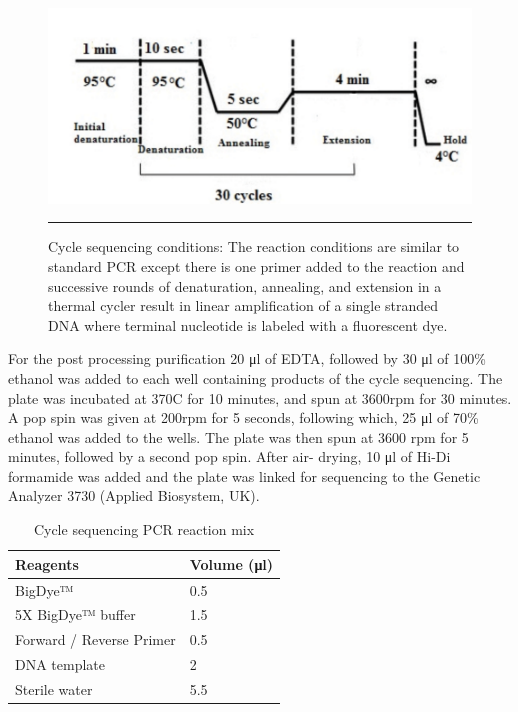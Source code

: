 \begin{figure}[!b]
\centering
\includegraphics[width=\linewidth]{Figures/2_7cycseqconditions.pdf} 
\rule{35em}{0.5pt}
\caption{Cycle sequencing conditions: The reaction conditions are similar to standard PCR except there is one primer added to the reaction and successive rounds of denaturation, annealing, and extension in a thermal cycler result in linear amplification of a single stranded DNA where terminal nucleotide is labeled with a fluorescent dye.}
\label{fig:2_7cycseqconditions}
\end{figure}

For the post processing purification 20 μl of EDTA, followed by 30 μl of 100\% ethanol was added to each well containing products of the cycle sequencing. The plate was incubated at 370C for 10 minutes, and spun at 3600rpm for 30 minutes. A pop spin was given at 200rpm for 5 seconds, following which, 25 μl of 70\% ethanol was added to the wells. The plate was then spun at 3600 rpm for 5 minutes, followed by a second pop spin. After air- drying, 10 μl of Hi-Di formamide was added and the plate was linked for sequencing to the Genetic Analyzer 3730 (Applied Biosystem, UK). 

\begin{table}[!h]
\centering
\caption{Cycle sequencing PCR reaction mix}
\label{tab:2.3cycseqmm}
\begin{tabular}{ | l | l | }
\hline
	Reagents           & Volume (μl) \\ \hline
	BigDye™ & 0.5 \\ \hline
	5X BigDye™ buffer & 1.5 \\ \hline
	Forward / Reverse Primer & 0.5 \\ \hline
	DNA template & 2 \\ \hline
	Sterile water & 5.5 \\ \hline
\end{tabular}
\end{table}

